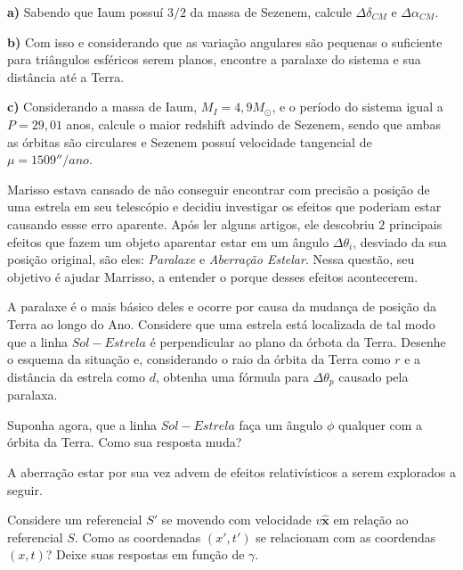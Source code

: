 \documentclass[11pt]{article}
\begin{document}
\begin{pproblem}
    \textbf{a)} Sabendo que Iaum possuí \(3/2\) da massa de Sezenem, calcule \(\Delta\delta_{CM}\) e \(\Delta\alpha_{CM}\).
    
    \textbf{b)} Com isso e considerando que as variação angulares são pequenas o suficiente para triângulos esféricos serem planos, encontre a paralaxe do sistema e sua distância até a Terra.

    \textbf{c)} Considerando a massa de Iaum, \(M_I = 4,9 M_\odot\), e o período do sistema igual a \(P = 29,01\) anos, calcule o maior redshift advindo de Sezenem, sendo que ambas as órbitas são circulares e Sezenem possuí velocidade tangencial de \(\mu = 1509''/ano\).

\end{pproblem}

\begin{pproblem} Marisso estava cansado de não conseguir encontrar com precisão a posição de uma estrela em seu telescópio e decidiu investigar os efeitos que poderiam estar causando essse erro aparente. Após ler alguns artigos, ele descobriu \(2\) principais efeitos que fazem um objeto aparentar estar em um ângulo \(\Delta \theta_i\), desviado da sua posição original, são eles: \textit{Paralaxe} e \textit{Aberração Estelar}. Nessa questão, seu objetivo é ajudar Marrisso, a entender o porque desses efeitos acontecerem.
    \begin{alternativas}
        \item A paralaxe é o mais básico deles e ocorre por causa da mudança de posição da Terra ao longo do Ano. Considere que uma estrela está localizada de tal modo que a linha \(Sol-Estrela\) é perpendicular ao plano da órbota da Terra. Desenhe o esquema da situação e, considerando o raio da órbita da Terra como \(r\) e a distância da estrela como \(d\), obtenha uma fórmula para \(\Delta \theta_p\) causado pela paralaxa.
        
        \item Suponha agora, que a linha \(Sol-Estrela\) faça um ângulo \(\phi\) qualquer com a órbita da Terra. Como sua resposta muda?
        
        A aberração estar por sua vez advem de efeitos relativísticos a serem explorados a seguir.

        \item Considere um referencial \(S'\) se movendo com velocidade \(v\hat{\mathbf{x}}\) em relação ao referencial \(S\). Como as coordenadas \((x', t')\) se relacionam com as coordendas \((x,t)\)? Deixe suas respostas em função de \(\gamma\).
        

\end{alternativas}
\end{pproblem}
\end{document}
